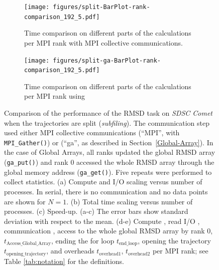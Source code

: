 \begin{figure}[!htb]
  \begin{subfigure} {.45\textwidth}
    \texttt{[image: figures/split-BarPlot-rank-comparison\_192\_5.pdf]}
    \captionsetup{format=hang}
    \caption{Time comparison on different parts of the calculations per MPI rank with MPI collective communications.}
    \label{fig:MPIranks-split}
  \end{subfigure}
  \hfill
  \begin{subfigure} {.5\textwidth}
    \texttt{[image: figures/split-ga-BarPlot-rank-comparison\_192\_5.pdf]}
    \captionsetup{format=hang}
    \caption{Time comparison on different parts of the calculations per MPI rank using }
    \label{fig:MPIranks-split-ga}
\end{subfigure}
\caption{Comparison of the performance of the RMSD task on \emph{SDSC Comet} when the trajectories are split (\emph{subfiling}).
  The communication step used either MPI collective communications (``MPI'', with \texttt{MPI\_Gather()}) or   (``ga'', as described in Section~\protect\ref{Global-Array}).
  In the case of Global Arrays, all ranks updated the global RMSD array (\texttt{ga\_put()}) and rank 0 accessed the whole RMSD array through the global memory address (\texttt{ga\_get()}).
  Five repeats were performed to collect statistics.
  (a) Compute and I/O scaling versus number of processes.
  In serial, there is no communication and no data points are shown for $N=1$.
  (b) Total time scaling versus number of processes.
  (c) Speed-up.
  (a-c) The error bars show standard deviation with respect to the mean.
  (d-e) Compute \tcomp, read I/O \tIO, communication \tcomm, access to the whole global RMSD array by rank 0, $t_{\text{Access\_Global\_Array}}$, ending the for loop $t_{\text{end\_loop}}$, opening the trajectory $t_{\text{opening\_trajectory}}$, and overheads $t_{\text{overhead1}}$, $t_{\text{overhead2}}$ per MPI rank; see Table \ref{tab:notation} for the definitions.
}
\label{fig:MPIwithIO-split}
\end{figure}


